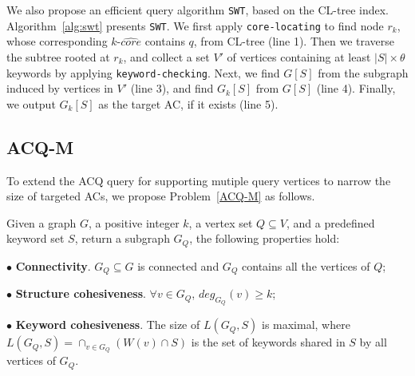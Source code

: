 {We also propose an efficient query algorithm {\tt SWT}, based on the CL-tree index.
Algorithm~\ref{alg:swt} presents {\tt SWT}. We first apply {\tt core-locating} to find node $r_k$, whose corresponding $k$-$\widehat {core}$ contains $q$, from CL-tree (line 1).
Then we traverse the subtree rooted at $r_k$, and collect a set $V'$ of vertices containing at least $|S|\times \theta$ keywords by applying {\tt keyword-checking}.
Next, we find $G[S]$ from the subgraph induced by vertices in $V'$ (line 3),
and find $G_k[S]$ from $G[S]$ (line 4).
Finally, we output $G_k[S]$ as the target AC, if it exists (line 5).



\subsection{ACQ-M}

To extend the ACQ query for supporting mutiple query vertices to narrow the size of targeted ACs, we propose Problem~\ref{ACQ-M} as follows.

\begin{problem}
\label{ACQ-M}
Given a graph $G$, a positive integer $k$, a vertex set $Q$$\subseteq$$V$, and a predefined keyword set $S$, return a subgraph $G_Q$, the following properties hold:

$\bullet$ \textbf{Connectivity}. $G_Q \subseteq G$ is connected and $G_Q$ contains all the vertices of $Q$;

$\bullet$ \textbf{Structure cohesiveness}. $\forall$$v\in G_Q$, $deg_{G_Q}(v)\geq$$k$;

$\bullet$ \textbf{Keyword cohesiveness}. The size of $L(G_Q, S)$ is maximal, where $L(G_Q, S)=\cap_{v \in G_Q}(W(v)\cap S)$ is the set of keywords shared in $S$ by all vertices of $G_Q$.
\end{problem}

}
